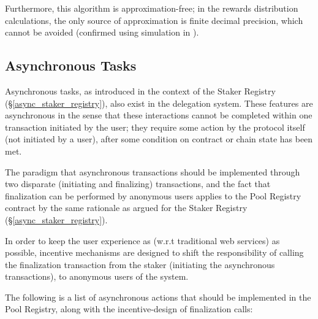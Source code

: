 Furthermore, this algorithm is approximation-free; in the rewards distribution calculations, the only source of approximation is finite decimal precision, which cannot be avoided (confirmed using simulation in \cite{Sha19}).  

\subsection{Asynchronous Tasks} \label{async_pool_registry}
Asynchronous tasks, as introduced in the context of the Staker Registry (\S\ref{async_staker_registry}), also exist in the delegation system. These features are asynchronous in the sense that these interactions cannot be completed within one transaction initiated by the user; they require some action by the protocol itself (not initiated by a user), after some condition on contract or chain state has been met.   

The paradigm that asynchronous transactions should be implemented through two disparate (initiating and finalizing) transactions, and the fact that finalization can be performed by anonymous users applies to the Pool Registry contract by the same rationale as argued for the Staker Registry (\S\ref{async_staker_registry}).

In order to keep the user experience as  (w.r.t traditional web services) as possible, incentive mechanisms are designed to shift the responsibility of calling the finalization transaction from the staker (initiating the asynchronous transactions), to anonymous users of the system.

The following is a list of asynchronous actions that should be implemented in the Pool Registry, along with the incentive-design of finalization calls:

